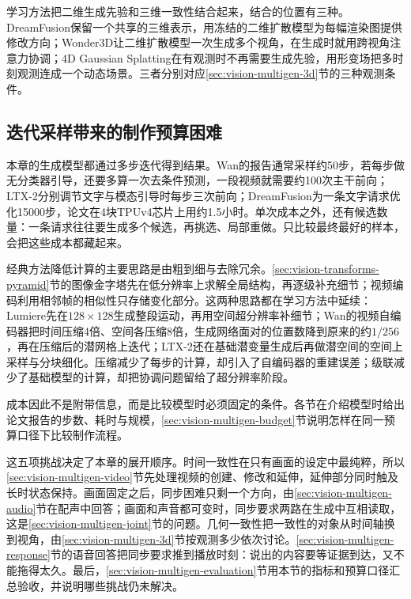 学习方法把二维生成先验和三维一致性结合起来，结合的位置有三种。DreamFusion保留一个共享的三维表示，用冻结的二维扩散模型为每幅渲染图提供修改方向；Wonder3D让二维扩散模型一次生成多个视角，在生成时就用跨视角注意力协调；4D Gaussian Splatting在有观测时不再需要生成先验，用形变场把多时刻观测连成一个动态场景。三者分别对应\ref{sec:vision-multigen-3d}节的三种观测条件。

\subsection{迭代采样带来的制作预算困难}
\label{sec:vision-multigen-challenge-budget}

本章的生成模型都通过多步迭代得到结果。Wan的报告通常采样约50步，若每步做无分类器引导，还要多算一次去条件预测，一段视频就需要约100次主干前向；LTX-2分别调节文字与模态引导时每步三次前向；DreamFusion为一条文字请求优化15000步，论文在4块TPUv4芯片上用约1.5小时。单次成本之外，还有候选数量：一条请求往往要生成多个候选，再挑选、局部重做。只比较最终最好的样本，会把这些成本都藏起来。

经典方法降低计算的主要思路是由粗到细与去除冗余。\ref{sec:vision-transforms-pyramid}节的图像金字塔先在低分辨率上求解全局结构，再逐级补充细节；视频编码利用相邻帧的相似性只存储变化部分。这两种思路都在学习方法中延续：Lumiere先在$128\times128$生成整段运动，再用空间超分辨率补细节；Wan的视频自编码器把时间压缩4倍、空间各压缩8倍，生成网络面对的位置数降到原来的约$1/256$，再在压缩后的潜网格上迭代；LTX-2还在基础潜变量生成后再做潜空间的空间上采样与分块细化。压缩减少了每步的计算，却引入了自编码器的重建误差；级联减少了基础模型的计算，却把协调问题留给了超分辨率阶段。

成本因此不是附带信息，而是比较模型时必须固定的条件。各节在介绍模型时给出论文报告的步数、耗时与规模，\ref{sec:vision-multigen-budget}节说明怎样在同一预算口径下比较制作流程。

这五项挑战决定了本章的展开顺序。时间一致性在只有画面的设定中最纯粹，所以\ref{sec:vision-multigen-video}节先处理视频的创建、修改和延伸，延伸部分同时触及长时状态保持。画面固定之后，同步困难只剩一个方向，由\ref{sec:vision-multigen-audio}节在配声中回答；画面和声音都可变时，同步要求两路在生成中互相读取，这是\ref{sec:vision-multigen-joint}节的问题。几何一致性把一致性的对象从时间轴换到视角，由\ref{sec:vision-multigen-3d}节按观测多少依次讨论。\ref{sec:vision-multigen-response}节的语音回答把同步要求推到播放时刻：说出的内容要等证据到达，又不能拖得太久。最后，\ref{sec:vision-multigen-evaluation}节用本节的指标和预算口径汇总验收，并说明哪些挑战仍未解决。

